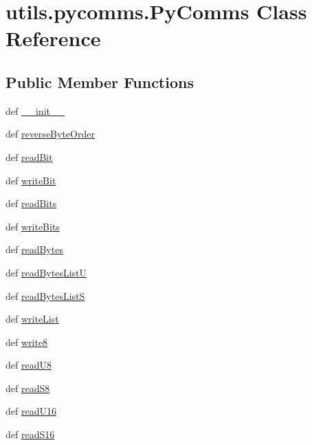\hypertarget{classutils_1_1pycomms_1_1PyComms}{}\section{utils.\+pycomms.\+Py\+Comms Class Reference}
\label{classutils_1_1pycomms_1_1PyComms}
\subsection*{Public Member Functions}
\begin{DoxyCompactItemize}
\item 
def \hyperlink{classutils_1_1pycomms_1_1PyComms_a45295d176512536f92904b84fd3740f2}{\+\_\+\+\_\+init\+\_\+\+\_\+}
\item 
def \hyperlink{classutils_1_1pycomms_1_1PyComms_a706384d36fbfd8c72a7109dde0e60b62}{reverse\+Byte\+Order}
\item 
def \hyperlink{classutils_1_1pycomms_1_1PyComms_aded5eb06846959d14396fd2b8193bd2a}{read\+Bit}
\item 
def \hyperlink{classutils_1_1pycomms_1_1PyComms_ae10c9ed40b3370b72d345be6ab4a83ce}{write\+Bit}
\item 
def \hyperlink{classutils_1_1pycomms_1_1PyComms_ad9430b7c85516360aad7afc3620de918}{read\+Bits}
\item 
def \hyperlink{classutils_1_1pycomms_1_1PyComms_a63c9228e56fbf92e52aa2a0393b37a64}{write\+Bits}
\item 
def \hyperlink{classutils_1_1pycomms_1_1PyComms_ad3fd5c56a9587d0be8bfb87487b349e9}{read\+Bytes}
\item 
def \hyperlink{classutils_1_1pycomms_1_1PyComms_a32cdee5cba02d0d7fc5a28fa2cecf4d3}{read\+Bytes\+List\+U}
\item 
def \hyperlink{classutils_1_1pycomms_1_1PyComms_a531d9f804a0d77b37a2bd98e52f9faf9}{read\+Bytes\+List\+S}
\item 
def \hyperlink{classutils_1_1pycomms_1_1PyComms_ac32f485fcb422ca9d37a9439424f7f5f}{write\+List}
\item 
def \hyperlink{classutils_1_1pycomms_1_1PyComms_a73eb98b3a921c6a7a8ed76ea2303ae73}{write8}
\item 
def \hyperlink{classutils_1_1pycomms_1_1PyComms_ad8902eafc72b06e02ed6310a651613d8}{read\+U8}
\item 
def \hyperlink{classutils_1_1pycomms_1_1PyComms_a35cf94609b52486bebddb81cadb601ea}{read\+S8}
\item 
def \hyperlink{classutils_1_1pycomms_1_1PyComms_a23233a837f1d7e396cf3570c6f9fdc08}{read\+U16}
\item 
def \hyperlink{classutils_1_1pycomms_1_1PyComms_ae6cca9384fa177200295094e8eba73f1}{read\+S16}
\end{DoxyCompactItemize}
